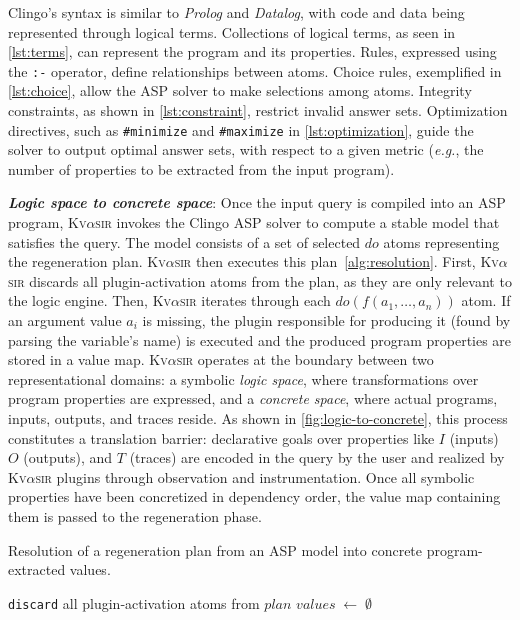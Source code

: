 \documentclass[nonacm,sigplan]{acmart}
\def\eg{{\em e.g.}, }
\newcommand{\sys}{{\scshape Kv{$\alpha$}sir}\xspace}
\newcommand{\heading}[1]{\vspace{2pt}\noindent\textbf{\emph{#1}}:\enspace}
\newcommand{\ttt}[1]{\texttt{#1}\xspace}
\begin{document}
Clingo's syntax is similar to \textit{Prolog} and \textit{Datalog}, with code and data being represented
through logical terms.
Collections of logical terms, as seen in
\cref{lst:terms}, can represent the program and its properties.
Rules, expressed using
the \ttt{:-} operator, define relationships
between atoms.
Choice rules, exemplified in \cref{lst:choice}, allow the ASP
solver to make selections among atoms.
Integrity constraints, as shown in
\cref{lst:constraint}, restrict invalid answer sets.
Optimization
directives, such as \ttt{\#minimize} and \ttt{\#maximize} in
\cref{lst:optimization}, guide the solver to output optimal answer sets,
with respect to a given metric (\eg the number of properties to be extracted from the input program).

\heading{Logic space to concrete space}
Once the input query is compiled into an ASP program, \sys invokes the Clingo
ASP solver to compute a stable model that satisfies the query.
The model consists of a set of selected $\mathit{do}$ atoms representing the regeneration plan.
\sys then executes this plan~\cref{alg:resolution}.
First, \sys discards all plugin-activation atoms from the plan, 
as they are only relevant to the logic engine.
Then, \sys iterates through each
$\mathit{do}(f(a_1,\dots,a_n))$ atom.
If an argument value $a_i$ is missing, the plugin responsible for producing
it (found by parsing the variable's name) is executed and the produced program properties are stored in a value map.
\sys operates at the boundary between two representational domains: a symbolic
\emph{logic space}, where transformations over program properties are expressed, and
a \emph{concrete space}, where actual programs, inputs, outputs, and traces
reside.
As shown in \cref{fig:logic-to-concrete}, this process constitutes a
translation barrier: declarative goals over properties like $I$ (inputs)
$O$ (outputs), and $T$ (traces) are encoded in the query by the user and realized by \sys plugins through observation and instrumentation.
Once all symbolic properties have been concretized in dependency order, the value map containing them is passed to the regeneration phase.

\begin{algorithm}[t]
\caption{Resolution of a regeneration plan from an ASP model into concrete program-extracted values.}
\label{alg:resolution}
\DontPrintSemicolon
{}
\ttt{discard} all plugin‐activation atoms from \(\mathit{plan}\)\;
\(\mathit{values}\;\gets\;\emptyset\)\;
\end{algorithm}
\end{document}
